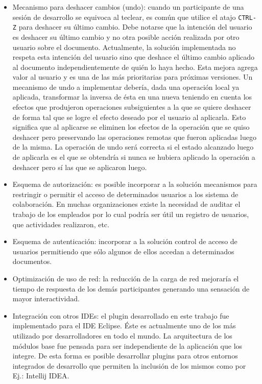 \documentclass[12pt,a4paper]{article}
\begin{document}
\begin{itemize}
	\item Mecanismo para deshacer cambios (undo)\cite{undo1,undo2}: cuando un participante de una sesión de desarrollo se equivoca al teclear, es común
		que utilice el atajo \texttt{CTRL-Z} para deshacer su último cambio. Debe notarse que la intención del usuario es deshacer su
		último cambio y no otra posible acción realizada por otro usuario sobre el documento. Actualmente, la solución implementada
		no respeta esta intención del usuario sino que deshace el último cambio aplicado al documento independientemente de
		quién lo haya hecho. Esta mejora agrega valor al usuario y es una de las más prioritarias para próximas versiones.
		Un mecanismo de undo a implementar debería, dada una operación local ya aplicada, transformar la inversa de ésta en una nueva
		teniendo en cuenta los efectos que produjeron operaciones subsiguientes a la que se quiere deshacer de forma tal que se logre 
		el efecto deseado por el usuario al aplicarla. Esto significa que al aplicarse se eliminen los efectos de la operación que
		se quiso deshacer pero preservando las operaciones remotas que fueron aplicadas luego de la misma. La operación de undo será
		correcta si el estado alcanzado luego de aplicarla es el que se obtendría si nunca se hubiera aplicado la operación a deshacer
		pero sí las que se aplicaron luego.
		
	\item Esquema de autorización: es posible incorporar a la solución mecanismos para restringir o permitir el acceso de determinados
		usuarios a los sistema de colaboración. En muchas organizaciones existe la necesidad de auditar el trabajo de los empleados 
		por lo cual podría ser útil un registro de usuarios, que actividades realizaron, etc.

	\item Esquema de autenticación: incorporar a la solución control de acceso de usuarios permitiendo que sólo algunos
		de ellos accedan a determinados documentos.

	\item Optimización de uso de red: la reducción de la carga de red mejoraría el tiempo de respuesta de los demás participantes
		generando una sensación de mayor interactividad.

	\item Integración con otros IDEs: el plugin desarrollado en este trabajo fue implementado para el IDE Eclipse. Éste es
		actualmente uno de los más utilizado por desarrolladores en todo el mundo. La arquitectura de los módulos base fue pensada 
		para ser independiente de la aplicación que los integre. De esta forma es posible desarrollar plugins para otros entornos
		integrados de desarrollo que permiten la inclusión de los mismos como por Ej.: Intellij IDEA.


\end{itemize}
\end{document}
